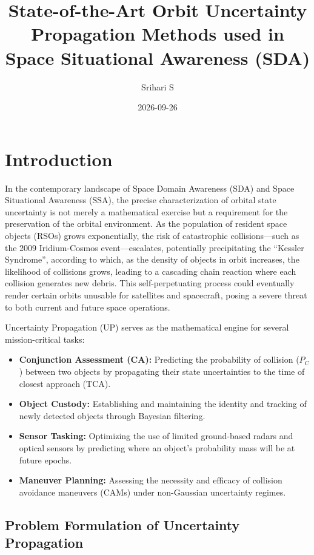 \documentclass[
  letterpaper,
  DIV=11,
  numbers=noendperiod,
  oneside]{scrartcl}
\title{State-of-the-Art Orbit Uncertainty Propagation Methods used in
Space Situational Awareness (SDA)}
\author{Srihari S}
\date{2026-09-26}
\begin{document}
\maketitle


\section{Introduction}\label{introduction}

In the contemporary landscape of Space Domain Awareness (SDA) and Space
Situational Awareness (SSA), the precise characterization of orbital
state uncertainty is not merely a mathematical exercise but a
requirement for the preservation of the orbital environment. As the
population of resident space objects (RSOs) grows exponentially, the
risk of catastrophic collisions---such as the 2009 Iridium-Cosmos
event---escalates, potentially precipitating the ``Kessler Syndrome'',
according to which, as the density of objects in orbit increases, the
likelihood of collisions grows, leading to a cascading chain reaction
where each collision generates new debris. This self-perpetuating
process could eventually render certain orbits unusable for satellites
and spacecraft, posing a severe threat to both current and future space
operations.

Uncertainty Propagation (UP) serves as the mathematical engine for
several mission-critical tasks:

\begin{itemize}
\item
  \textbf{Conjunction Assessment (CA):} Predicting the probability of
  collision (\(P_C\)) between two objects by propagating their state
  uncertainties to the time of closest approach (TCA).
\item
  \textbf{Object Custody:} Establishing and maintaining the identity and
  tracking of newly detected objects through Bayesian filtering.
\item
  \textbf{Sensor Tasking:} Optimizing the use of limited ground-based
  radars and optical sensors by predicting where an object's probability
  mass will be at future epochs.
\item
  \textbf{Maneuver Planning:} Assessing the necessity and efficacy of
  collision avoidance maneuvers (CAMs) under non-Gaussian uncertainty
  regimes.
\end{itemize}

\subsection{Problem Formulation of Uncertainty
Propagation}\label{problem-formulation-of-uncertainty-propagation}
\end{document}
